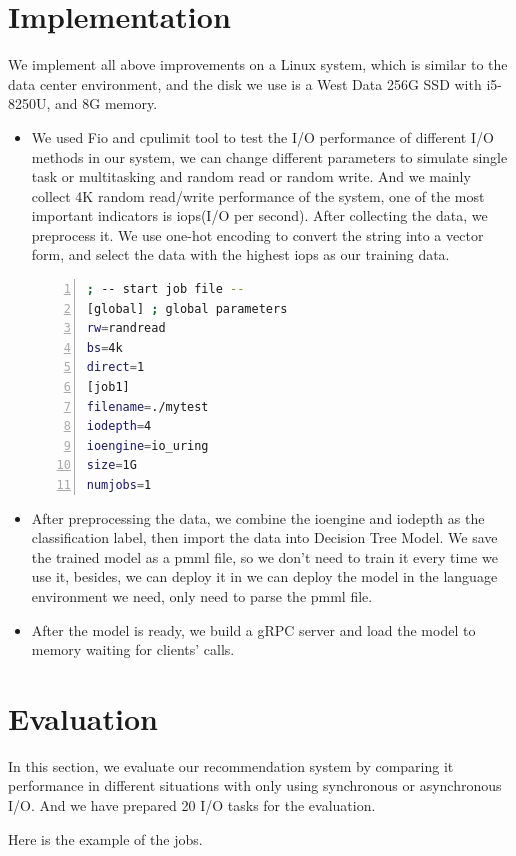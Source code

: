 \documentclass[conference]{IEEEtran}
\begin{document}
\section{Implementation}
We implement all above improvements on a Linux system, which is similar to the data center environment, and the disk we use is a West Data 256G SSD with i5-8250U, and 8G memory.
\begin{itemize}

	\item We used Fio and cpulimit tool to test the I/O performance of different I/O methods in our system,
	 we can change different parameters to simulate single task or multitasking and random read or random write.
	 And we mainly collect 4K random read/write performance of the system, one of the most important indicators is iops(I/O per second).
	 After collecting the data, we preprocess it. We use one-hot encoding to convert the string into a vector form, and select the data with the highest iops as our training data.


	      \begin{lstlisting}[language={bash},
		basicstyle=\normalsize\menlo,
        numbers=left]
; -- start job file --
[global] ; global parameters
rw=randread 
bs=4k
direct=1
[job1]
filename=./mytest
iodepth=4
ioengine=io_uring
size=1G
numjobs=1
\end{lstlisting}

	\item After preprocessing the data, we combine the ioengine and iodepth as the classification label, then import the data into Decision Tree Model. 
	We save the trained model as a pmml file, so we don't need to train it every time we use it, besides, we can deploy it in we can deploy the model in the language environment we need, only need to parse the pmml file.
	\item After the model is ready, we build a gRPC server and load the model to memory waiting for clients' calls.
\end{itemize}


\section{Evaluation}
	In this section, we evaluate our recommendation system by comparing it performance in different situations with only using synchronous or asynchronous I/O.
	And we have prepared 20 I/O tasks for the evaluation.

	Here is the example of the jobs.
\end{document}
